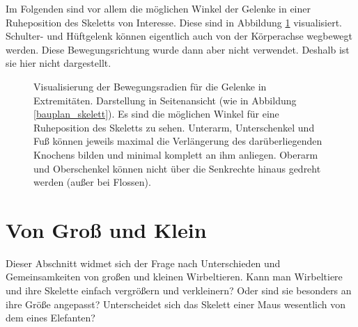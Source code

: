 Im Folgenden sind vor allem die möglichen Winkel der Gelenke in einer Ruheposition des Skeletts von Interesse. Diese sind in Abbildung \ref{joints} visualisiert. Schulter- und Hüftgelenk können eigentlich auch von der Körperachse wegbewegt werden. Diese Bewegungsrichtung wurde dann aber nicht verwendet. Deshalb ist sie hier nicht dargestellt.

\begin{figure}
  \qquad
  
  \caption{Visualisierung der Bewegungsradien für die Gelenke in Extremitäten. Darstellung in Seitenansicht (wie in Abbildung \ref{bauplan_skelett}). Es sind die möglichen Winkel für eine Ruheposition des Skeletts zu sehen. Unterarm, Unterschenkel und Fuß können jeweils maximal die Verlängerung des darüberliegenden Knochens bilden und minimal komplett an ihm anliegen. Oberarm und Oberschenkel können nicht über die Senkrechte hinaus gedreht werden (außer bei Flossen).}
  \label{joints}
 \end{figure}


\section{Von Groß und Klein}

Dieser Abschnitt widmet sich der Frage nach Unterschieden und Gemeinsamkeiten von großen und kleinen Wirbeltieren. Kann man Wirbeltiere und ihre Skelette einfach vergrößern und verkleinern? Oder sind sie besonders an ihre Größe angepasst? Unterscheidet sich das Skelett einer Maus wesentlich von dem eines Elefanten?

